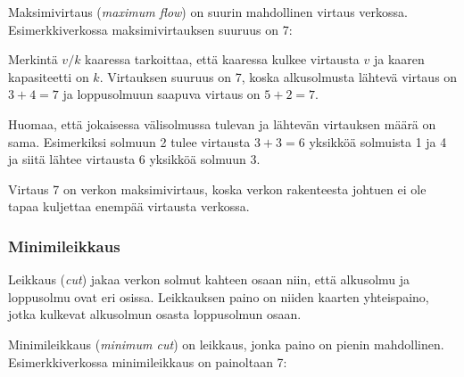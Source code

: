 Maksimivirtaus (\textit{maximum flow}) on suurin
mahdollinen virtaus verkossa.
Esimerkkiverkossa maksimivirtauksen suuruus on 7:

\begin{center}
\end{center}

Merkintä $v/k$ kaaressa tarkoittaa,
että kaaressa kulkee virtausta $v$
ja kaaren kapasiteetti on $k$.
Virtauksen suuruus on 7, koska alkusolmusta
lähtevä virtaus on $3+4=7$ ja loppusolmuun
saapuva virtaus on $5+2=7$.

Huomaa, että jokaisessa välisolmussa tulevan ja
lähtevän virtauksen määrä on sama.
Esimerkiksi solmuun 2 tulee virtausta $3+3=6$ yksikköä solmuista 1 ja 4
ja siitä lähtee virtausta $6$ yksikköä solmuun 3.

Virtaus 7 on verkon maksimivirtaus, koska verkon
rakenteesta johtuen ei ole tapaa
kuljettaa enempää virtausta verkossa.

\subsubsection{Minimileikkaus}

Leikkaus (\textit{cut}) jakaa verkon solmut
kahteen osaan niin, että alkusolmu ja loppusolmu
ovat eri osissa.
Leikkauksen paino on niiden kaarten yhteispaino,
jotka kulkevat alkusolmun osasta loppusolmun osaan.

Minimileikkaus (\textit{minimum cut})
on leikkaus, jonka paino on pienin mahdollinen.
Esimerkkiverkossa minimileikkaus on painoltaan 7:

